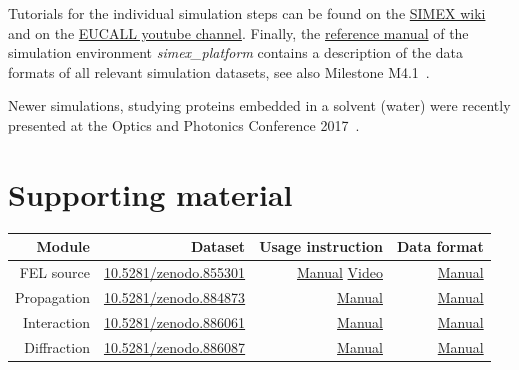 \documentclass[10pt]{scrartcl}
\begin{document}
Tutorials for the individual simulation steps can be found on the
\href{https://www.github.com/eucall-software/simex_platform/wiki/SimEx-Tutorial}{SIMEX wiki} and
on the
\href{https://www.youtube.com/channel/UC5H8cATZiUPNfF7P_xEhBpQ/videos}{EUCALL youtube channel}.
Finally, the \href{https://eucall-software.github.io/simex_platform/}{reference
manual} of the simulation environment \textit{simex\_platform}
contains a description of the data formats of all relevant simulation datasets, see also
Milestone M4.1~\cite{EUCALL_SIMEX_M4.1}.

Newer simulations, studying proteins embedded in
a solvent (water) were recently presented at the Optics and Photonics Conference
2017~\cite{Fortmann-Grote2017b}.

\section{Supporting material}
\begin{tabular}[ht]{|r|r|r|r|}
  \hline
  \textbf{Module}       & \textbf{Dataset}  &
  \textbf{Usage instruction}   & \textbf{Data format}       \\
  \hline
    FEL source &
    \href{https://dx.doi.org/10.5281/zenodo.855301}{10.5281/zenodo.855301} &
    \href{https://github.com/eucall-software/simex_platform/wiki/SimEx-Tutorial#prepating-the-source-input}{Manual}
    \href{https://youtu.be/Ql1p5-CLHug}{Video} &
    \href{https://eucall-software.github.io/simex_platform/#fel-source-calculations-fast}{Manual}
  \\
    Propagation &
    \href{https://dx.doi.org/10.5281/zenodo.884873}{10.5281/zenodo.884873} &
    \href{https://github.com/eucall-software/simex_platform/wiki/SimEx-Tutorial#beamline-propagation}{Manual} &
    \href{https://eucall-software.github.io/simex_platform/#coherent-wavefront-propagation-wpg-srw}{Manual}
  \\
    Interaction &
    \href{https://dx.doi.org/10.5281/zenodo.886061}{10.5281/zenodo.886061} &
    \href{https://github.com/eucall-software/simex_platform/wiki/SimEx-Tutorial#photon-matter-interaction}{Manual} &
    \href{https://eucall-software.github.io/simex_platform/#photon-matter-interaction-xmdyn}{Manual}
  \\
    Diffraction &
    \href{https://dx.doi.org/10.5281/zenodo.886087}{10.5281/zenodo.886087} &
    \href{https://github.com/eucall-software/simex_platform/wiki/SimEx-Tutorial#diffraction}{Manual} &
    \href{https://eucall-software.github.io/simex_platform/#diffraction-singfel}{Manual}
  \\
  \hline
\end{tabular}
%

\printbibliography[notkeyword=zenodo,notkeyword=eucall, notkeyword=simex, notkeyword=tutorial, title={Articles}]
\printbibliography[notkeyword=zenodo,notkeyword=tutorial, keyword=simex,
keyword=eucall, title={Project Reports}]
\printbibliography[keyword=zenodo,notkeyword=tutorial, title={Datasets}]
%
%
\end{document}
